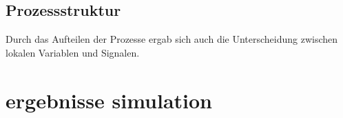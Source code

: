 \subsection*{Prozessstruktur}

Durch das Aufteilen der Prozesse ergab sich auch die Unterscheidung zwischen lokalen Variablen und Signalen.

\section{ergebnisse simulation}\label{sec.ergebnisse_tests}


